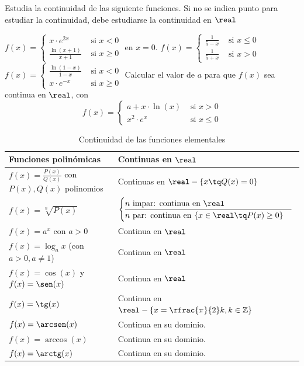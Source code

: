 \begin{problem}
Estudia la continuidad de las siguiente funciones.
\obs Si no se indica punto para estudiar la continuidad, debe estudiarse la continuidad en $\real$

\ppart[17.2-MadA] $f(x) = \begin{cases}\displaystyle x·e^{2x} &\mbox{ si } x<0\\ \displaystyle\frac{\ln(x+1)}{x+1}&\mbox{ si } x\geq 0\end{cases}$ en $x=0$. 
\ppart[16.2-MadB] $f(x) = \begin{cases}\displaystyle\frac{1}{5-x}&\mbox{ si }x\leq0\\\displaystyle\frac{1}{5+x}&\mbox{ si }x>0\end{cases}$
\ppart[16.1-MadA] $f(x) = \begin{cases}\displaystyle\frac{\ln(1-x)}{1-x}&\mbox{ si }x<0\\\displaystyle x·e^{-x}&\mbox{ si }x\geq 0\end{cases}$
\ppart[14.2-MadB] Calcular el valor de $a$ para que $f(x)$ sea continua en $\real$, con  \[f(x) = \begin{cases}a+x·\ln(x)&\mbox{ si }x>0\\\displaystyle x^2·e^x&\mbox{ si }x\leq 0\end{cases}\]

\solution
\end{problem}


\begin{table}[hbtp]
\begin{tabular}{|l|l|}
\hline
Funciones polinómicas & Continuas en $\real$\\\hline\hline
$f(x) = \frac{P(x)}{Q(x)}$ con $P(x),Q(x)$ polinomios& Continuas en $\real-\{x \tq Q(x)=0\}$\\\hline
$f(x) = \sqrt[n]{P(x)}$ & $\begin{cases}
n\text{ impar: continua en } \real\\\hline
n\text{ par: continua en } \{x\in\real\tq P(x) \geq 0\}\end{cases}$\\\hline
$f(x) = a^x$ con $a>0$ & Continua en $\real$\\\hline
$f(x) = \log_ax$ (con $a>0, a\neq 1$) & Continua en $\real$\\\hline
$f(x) = \cos(x)$ y $f(x) = \sen(x)$  & Continua en $\real$\\\hline
$f(x) = \tg(x)$   & Continua en $\real-\left\{x=\rfrac{\pi}{2}k, k\in\mathbb{Z}\right\}$\\\hline
$f(x) = \arcsen(x)$ & Continua en su dominio.\\
$f(x) = \arccos(x)$ & Continua en su dominio.\\
$f(x) = \arctg(x)$ & Continua en su dominio.\\\hline
\end{tabular}
\label{tbl::ContinuidadFunElementales}
\caption{Continuidad de las funciones elementales}
\end{table}




